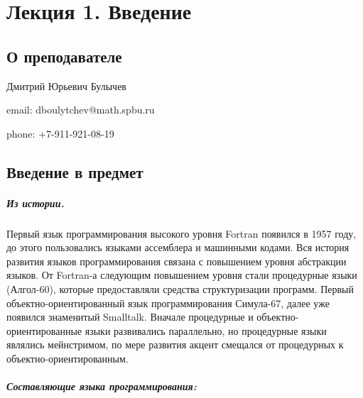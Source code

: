 \chapter{Лекция 1. Введение}

\section{О преподавателе}

Дмитрий Юрьевич Булычев

email: dboulytchev@math.spbu.ru

phone: +7-911-921-08-19

\section{Введение в предмет}

\paragraph{Из истории.} Первый язык программирования высокого уровня Fortran появился в 1957 году, до этого пользовались языками ассемблера и машинными кодами.
Вся история развития языков программирования связана с повышением уровня абстракции языков. От Fortran-а следующим повышением уровня стали процедурные языки
(Алгол-60), которые предоставляли средства структуризации программ. Первый объектно-ориентированный язык программирования Симула-67, далее уже появился знаменитый
Smalltalk. Вначале процедурные и объектно-ориентированные языки развивались параллельно, но процедурные языки являлись мейнстримом, по мере развития акцент смещался
от процедурных к объектно-ориентированным.

\paragraph{Составляющие языка программирования:}

